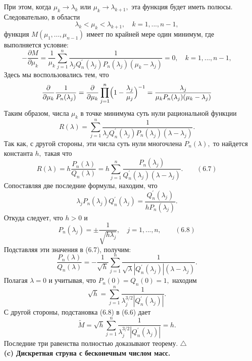 \documentclass[12pt,a4paper]{article}
\theoremstyle{plain}   \newtheorem{Pro}{Задача}
\begin{document}
При этом, когда
$ \mu _k \rightarrow \lambda _k $
или
$ \mu _k \rightarrow \lambda _{k+1} , $
эта функция будет иметь полюсы. Следовательно, в области
$$
  \lambda _k < \mu _k < \lambda _{k+1} ,
    \quad k=1,...,n-1,
$$
функция
$ M(\mu _1 ,...,\mu _{n-1}) $
имеет по крайней мере один минимум, где выполняется условие:
$$
  -\frac{\partial M}{\partial \mu _k}=
    \frac{1}{\mu _k} \sum _{j=1}^n
	  \frac{1}
	    {\lambda _j Q_n ^{\prime}(\lambda _j )
		  P_n (\lambda _j ) (\mu _k -\lambda _j )}=0,
		    \quad k=1,...,n-1,
$$
Здесь мы воспользовались тем, что
$$
  \frac{\partial}{\partial \mu _k}
    \frac{1}{P_n (\lambda _j )} =
	  \frac{\partial}{\partial \mu _k}
	    \prod _{j=1}^n \Bigl ( 1-
		  \frac{\lambda _j}{\mu _j} \Bigr ) ^{-1} =
		    \frac{\lambda _j}{\mu _k P_n (\lambda _j )
			  (\mu _k -\lambda _j )}
$$
Таким образом, числа
$ \mu _k $
в точке минимума суть нули рациональной функции
$$
  R(\lambda )=\sum _{j=1}^n \frac{1}
    {\lambda _j Q_n ^{\prime}(\lambda _j ) P_n (\lambda _j )
	  (\lambda -\lambda _j )}.
$$
Так как, с другой стороны, эти числа суть нули многочлена
$ P_n (\lambda ) , $
то найдется константа
$ h , $
такая что
$$
  R(\lambda )=h\frac{P_n (\lambda )}{Q_n (\lambda )}=
    h \sum _{j=1}^n \frac{P_n (\lambda _j )}
	  {Q_n ^{\prime}(\lambda _j ) (\lambda -\lambda _j )}.
	    \qquad (6.7)
$$
Сопоставляя две последние формулы, находим, что
$$
  \lambda _j P_n (\lambda _j ) Q_n ^{\prime}(\lambda _j ) =
    \frac{Q_n ^{\prime}(\lambda _j )}
	  {h P_n (\lambda _j )}.
$$
Откуда следует, что
$ h>0 $
и
$$
  P_n (\lambda _j )= \pm \frac{1}
    {\sqrt{h \lambda _j}},
	  \quad j=1,...,n,
	    \qquad (6.8)
$$
Подставляя эти значения в (6.7), получим:
$$
  \frac{P_n (\lambda )}{Q_n (\lambda )}=
    -\frac{1}{\sqrt{h}} \sum _{j=1}^n
	  \frac{1}{\sqrt{\lambda}|Q_n ^{\prime}(\lambda _j )|
	    (\lambda -\lambda _j )}.
$$
Полагая
$ \lambda =0 $
и учитывая, что
$ P_n (0) =Q_n (0) =1 , $
находим
$$
  \sqrt{h}=\sum _{j=1}^n \frac{1}
    {\lambda _j ^{3/2} |Q_n ^{\prime}(\lambda _j )|}.
$$
С другой стороны, подстановка (6.8) в (6.6) дает
$$
  \tilde M = \sqrt{h} \sum _{j=1}^n \frac{1}
    {\lambda _j ^{3/2} |Q_n ^{\prime}(\lambda _j )|}=h.
$$
Последние три равенства полностью доказывают теорему.
$ \triangle $
$$ \; $$
{\bfseries (c) Дискретная струна с бесконечным числом масс.} \\
\end{document}
